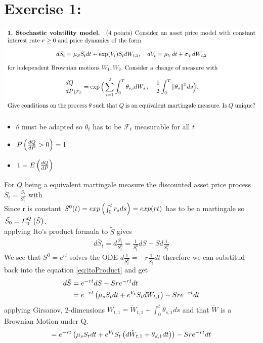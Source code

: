 \documentclass[document.tex]{subfiles}
\begin{document}
\section*{Exercise 1:}

\includegraphics[width=\textwidth]{ex1.png}
\begin{itemize}
	\item $\theta$ must be adapted so $\theta_t$ has to be  $\mathcal{F}_t$ measurable for all $t$ \\ 
	\item $P \left( \frac{dQ}{dP} > 0 \right) =1 $
	\item $1 = E \left( \frac{dQ}{dP} \right)$ 
\end{itemize}

For $Q$ being a equivalent martingale measure the discounted asset price process $\tilde{S_t} = \frac{S_t}{S^0_t}$ with \\ 
Since r is constant $S^0 (t) = exp \left( \int_0^t r_s ds \right) = exp(rt)$  has to be a martingale so $\tilde{S_0}= E^Q_0 \left( \tilde{S} \right)$.\\

applying Ito's product formula to $\tilde{S}$ gives
\begin{align}
	d \tilde{S_t} = d \frac{S_t}{S^0_t}
	= \frac{1}{S^0_t} d S + S d \frac{1}{S^0_t}  \label{eq:itoProduct}
  \end{align}
We see that $S^0=e^{rt}$ solves the ODE $d \frac{1}{S^0_t}=-r \frac{1}{S^0_t} dt$
therefore we can substitud back into the equation \eqref{eq:itoProduct} and get
\begin{align}
	d \tilde{S} &= e^{-rt} d S - S r e^{-rt} dt \\
	&= e^{-rt} \left( \mu_s S_t dt + e^{V_t} S_t dW_{t,1} \right)  - S r e^{-rt} dt 
\end{align}
applying Girsanov, 2-dimensions $W_{t,1} = \tilde{W}_{t,1} + \int_0^t \theta_{s,1} ds$ and that $\tilde{W}$ is a Brownian Motion under Q.	
\begin{align}
	= e^{-rt} \left( \mu_s S_t dt + e^{V_t} S_t \left( d\tilde{W}_{t,1} + \theta_{d,1} dt \right) \right)  - S r e^{-rt} dt
\end{align}
\end{document}
